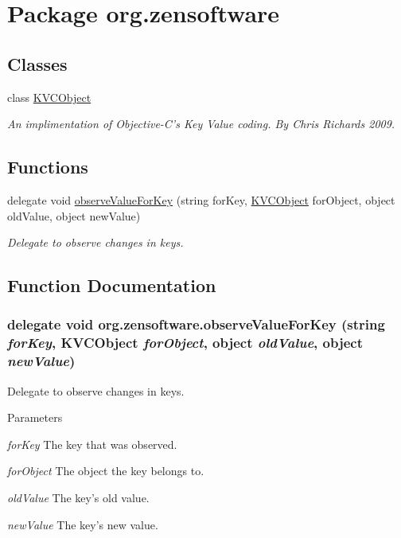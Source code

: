 \hypertarget{namespaceorg_1_1zensoftware}{
\section{Package org.zensoftware}
\label{namespaceorg_1_1zensoftware}
}
\subsection*{Classes}
\begin{DoxyCompactItemize}
\item 
class \hyperlink{classorg_1_1zensoftware_1_1_k_v_c_object}{KVCObject}
\begin{DoxyCompactList}\small\item\em An implimentation of Objective-\/C's Key Value coding. By Chris Richards 2009. \item\end{DoxyCompactList}\end{DoxyCompactItemize}
\subsection*{Functions}
\begin{DoxyCompactItemize}
\item 
delegate void \hyperlink{namespaceorg_1_1zensoftware_ac8d06cba1cd13c7c5f87363a0e1a5078}{observeValueForKey} (string forKey, \hyperlink{classorg_1_1zensoftware_1_1_k_v_c_object}{KVCObject} forObject, object oldValue, object newValue)
\begin{DoxyCompactList}\small\item\em Delegate to observe changes in keys. \item\end{DoxyCompactList}\end{DoxyCompactItemize}


\subsection{Function Documentation}
\hypertarget{namespaceorg_1_1zensoftware_ac8d06cba1cd13c7c5f87363a0e1a5078}{
\subsubsection[{observeValueForKey}]{\setlength{\rightskip}{0pt plus 5cm}delegate void org.zensoftware.observeValueForKey (string {\em forKey}, \/  KVCObject {\em forObject}, \/  object {\em oldValue}, \/  object {\em newValue})}}
\label{namespaceorg_1_1zensoftware_ac8d06cba1cd13c7c5f87363a0e1a5078}


Delegate to observe changes in keys. 
\begin{DoxyParams}{Parameters}
\item[{\em forKey}]The key that was observed.\item[{\em forObject}]The object the key belongs to.\item[{\em oldValue}]The key's old value.\item[{\em newValue}]The key's new value.\end{DoxyParams}
